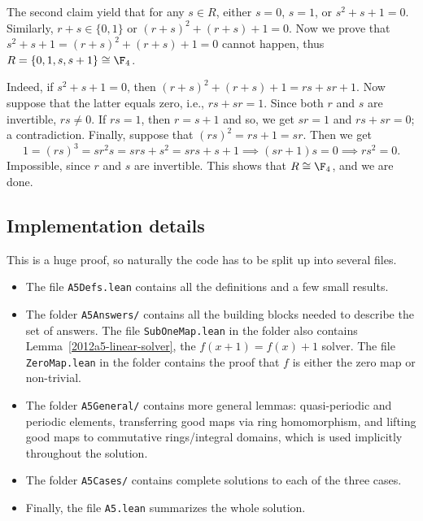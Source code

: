 The second claim yield that for any $s \in R$, either $s = 0$, $s = 1$, or $s^2 + s + 1 = 0$.
Similarly, $r + s \in \{0, 1\}$ or $(r + s)^2 + (r + s) + 1 = 0$.
Now we prove that $s^2 + s + 1 = (r + s)^2 + (r + s) + 1 = 0$ cannot happen, thus $R = \{0, 1, s, s + 1\} \cong \F_4$.

Indeed, if $s^2 + s + 1 = 0$, then $(r + s)^2 + (r + s) + 1 = rs + sr + 1$.
Now suppose that the latter equals zero, i.e., $rs + sr = 1$.
Since both $r$ and $s$ are invertible, $rs \neq 0$.
If $rs = 1$, then $r = s + 1$ and so, we get $sr = 1$ and $rs + sr = 0$; a contradiction.
Finally, suppose that $(rs)^2 = rs + 1 = sr$.
Then we get
\[ 1 = (rs)^3 = sr^2 s = srs + s^2 = srs + s + 1 \implies (sr + 1) s = 0 \implies rs^2 = 0. \]
Impossible, since $r$ and $s$ are invertible.
This shows that $R \cong \F_4$, and we are done.





\subsection*{Implementation details}

This is a huge proof, so naturally the code has to be split up into several files.
\begin{itemize}
    \item   The file \texttt{A5Defs.lean} contains all the definitions and a few small results.
    \item   The folder \texttt{A5Answers/} contains all the building blocks needed to describe the set of answers.
            The file \texttt{SubOneMap.lean} in the folder also contains Lemma~\ref{2012a5-linear-solver}, the $f(x + 1) = f(x) + 1$ solver.
            The file \texttt{ZeroMap.lean} in the folder contains the proof that $f$ is either the zero map or non-trivial.
    \item   The folder \texttt{A5General/} contains more general lemmas: quasi-periodic and periodic elements, transferring good maps via ring homomorphism, and lifting good maps to commutative rings/integral domains, which is used implicitly throughout the solution.
    \item   The folder \texttt{A5Cases/} contains complete solutions to each of the three cases.
    \item   Finally, the file \texttt{A5.lean} summarizes the whole solution.
\end{itemize}






